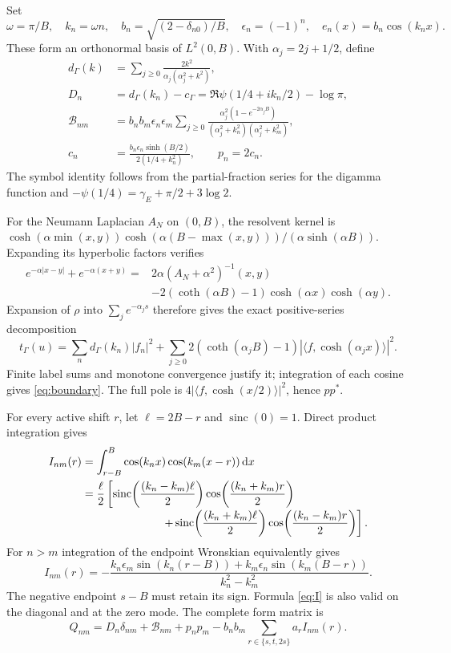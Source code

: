 \documentclass[11pt]{article}
\newcommand{\dd}{\,\mathrm d}
\newcommand{\ip}[2]{\langle#1,#2\rangle}
\newcommand{\sinc}{\operatorname{sinc}}
\begin{document}
Set
\[
 \omega=\pi/B,\quad k_n=\omega n,\quad
 b_n=\sqrt{(2-\delta_{n0})/B},\quad \epsilon_n=(-1)^n,\quad
 e_n(x)=b_n\cos(k_nx).
\]
These form an orthonormal basis of $L^2(0,B)$. With $\alpha_j=2j+1/2$, define
\begin{align}
 d_\Gamma(k)&=\sum_{j\ge0}\frac{2k^2}{\alpha_j(\alpha_j^2+k^2)},\nonumber\\
 D_n&=d_\Gamma(k_n)-c_\Gamma
       =\Re\psi(1/4+ik_n/2)-\log\pi,\label{eq:D}\\
 \mathcal B_{nm}&=b_nb_m\epsilon_n\epsilon_m
 \sum_{j\ge0}\frac{\alpha_j^2(1-e^{-2\alpha_jB})}
 { (\alpha_j^2+k_n^2)(\alpha_j^2+k_m^2)},\label{eq:boundary}\\
 c_n&=\frac{b_n\epsilon_n\sinh(B/2)}{2(1/4+k_n^2)},\qquad p_n=2c_n.\nonumber
\end{align}
The symbol identity follows from the partial-fraction series for the digamma function and $-\psi(1/4)=\gamma_E+\pi/2+3\log2$.

For the Neumann Laplacian $A_N$ on $(0,B)$, the resolvent kernel is
$\cosh(\alpha\min(x,y))\cosh(\alpha(B-\max(x,y)))/(\alpha\sinh(\alpha B))$.
Expanding its hyperbolic factors verifies
\begin{align}
 e^{-\alpha|x-y|}+e^{-\alpha(x+y)}={}&2\alpha(A_N+\alpha^2)^{-1}(x,y)\nonumber\\
 &-2(\coth(\alpha B)-1)\cosh(\alpha x)\cosh(\alpha y).
\end{align}
Expansion of $\rho$ into $\sum_j e^{-\alpha_js}$ therefore gives the exact positive-series decomposition
\[
 t_\Gamma(u)=\sum_n d_\Gamma(k_n)|f_n|^2
 +\sum_{j\ge0}2(\coth(\alpha_jB)-1)
       |\ip f{\cosh(\alpha_jx)}|^2.
\]
Finite label sums and monotone convergence justify it; integration of each cosine gives \eqref{eq:boundary}. The full pole is $4|\ip f{\cosh(x/2)}|^2$, hence $pp^*$.

For every active shift $r$, let $\ell=2B-r$ and $\sinc(0)=1$. Direct product integration gives
\begin{align}
 I_{nm}(r)&=\int_{r-B}^B\cos(k_nx)\cos(k_m(x-r))\dd x\nonumber\\
 &=\frac\ell2\left[
 \sinc\!\left(\frac{(k_n-k_m)\ell}2\right)
 \cos\!\left(\frac{(k_n+k_m)r}2\right)\right.\nonumber\\[-2pt]
 &\hspace{25mm}\left.+\sinc\!\left(\frac{(k_n+k_m)\ell}2\right)
 \cos\!\left(\frac{(k_n-k_m)r}2\right)\right].\label{eq:I}
\end{align}
For $n>m$ integration of the endpoint Wronskian equivalently gives
\[
 I_{nm}(r)=-\frac{k_n\epsilon_m\sin(k_n(r-B))
 +k_m\epsilon_n\sin(k_m(B-r))}{k_n^2-k_m^2}.
\]
The negative endpoint $s-B$ must retain its sign. Formula \eqref{eq:I} is also valid on the diagonal and at the zero mode. The complete form matrix is
\begin{equation}
 Q_{nm}=D_n\delta_{nm}+\mathcal B_{nm}+p_np_m
 -b_nb_m\sum_{r\in\{s,t,2s\}}a_rI_{nm}(r).\label{eq:Q}
\end{equation}
\end{document}
